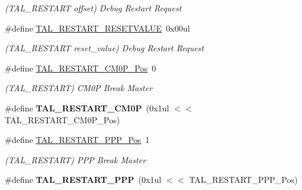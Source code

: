 \begin{DoxyCompactItemize}
\begin{DoxyCompactList}\small\item\em (T\+A\+L\+\_\+\+R\+E\+S\+T\+A\+R\+T offset) Debug Restart Request \end{DoxyCompactList}\item 
\hypertarget{group___s_a_m_l21___t_a_l_gaa7f5610727fe6943865479ce644cc76b}{}\#define \hyperlink{group___s_a_m_l21___t_a_l_gaa7f5610727fe6943865479ce644cc76b}{T\+A\+L\+\_\+\+R\+E\+S\+T\+A\+R\+T\+\_\+\+R\+E\+S\+E\+T\+V\+A\+L\+U\+E}~0x00ul\label{group___s_a_m_l21___t_a_l_gaa7f5610727fe6943865479ce644cc76b}

\begin{DoxyCompactList}\small\item\em (T\+A\+L\+\_\+\+R\+E\+S\+T\+A\+R\+T reset\+\_\+value) Debug Restart Request \end{DoxyCompactList}\item 
\hypertarget{group___s_a_m_l21___t_a_l_gac6503ef968e74386242eebc129eccd4c}{}\#define \hyperlink{group___s_a_m_l21___t_a_l_gac6503ef968e74386242eebc129eccd4c}{T\+A\+L\+\_\+\+R\+E\+S\+T\+A\+R\+T\+\_\+\+C\+M0\+P\+\_\+\+Pos}~0\label{group___s_a_m_l21___t_a_l_gac6503ef968e74386242eebc129eccd4c}

\begin{DoxyCompactList}\small\item\em (T\+A\+L\+\_\+\+R\+E\+S\+T\+A\+R\+T) C\+M0\+P Break Master \end{DoxyCompactList}\item 
\hypertarget{group___s_a_m_l21___t_a_l_ga2e305d1f04d1e9dc5d7e94e5b868e30c}{}\#define {\bfseries T\+A\+L\+\_\+\+R\+E\+S\+T\+A\+R\+T\+\_\+\+C\+M0\+P}~(0x1ul $<$$<$ T\+A\+L\+\_\+\+R\+E\+S\+T\+A\+R\+T\+\_\+\+C\+M0\+P\+\_\+\+Pos)\label{group___s_a_m_l21___t_a_l_ga2e305d1f04d1e9dc5d7e94e5b868e30c}

\item 
\hypertarget{group___s_a_m_l21___t_a_l_ga25d3abb34388aac387e64db155b13ad1}{}\#define \hyperlink{group___s_a_m_l21___t_a_l_ga25d3abb34388aac387e64db155b13ad1}{T\+A\+L\+\_\+\+R\+E\+S\+T\+A\+R\+T\+\_\+\+P\+P\+P\+\_\+\+Pos}~1\label{group___s_a_m_l21___t_a_l_ga25d3abb34388aac387e64db155b13ad1}

\begin{DoxyCompactList}\small\item\em (T\+A\+L\+\_\+\+R\+E\+S\+T\+A\+R\+T) P\+P\+P Break Master \end{DoxyCompactList}\item 
\hypertarget{group___s_a_m_l21___t_a_l_gadc80a9312d5aa68e3e3d6d150636062a}{}\#define {\bfseries T\+A\+L\+\_\+\+R\+E\+S\+T\+A\+R\+T\+\_\+\+P\+P\+P}~(0x1ul $<$$<$ T\+A\+L\+\_\+\+R\+E\+S\+T\+A\+R\+T\+\_\+\+P\+P\+P\+\_\+\+Pos)\label{group___s_a_m_l21___t_a_l_gadc80a9312d5aa68e3e3d6d150636062a}


\end{DoxyCompactItemize}

